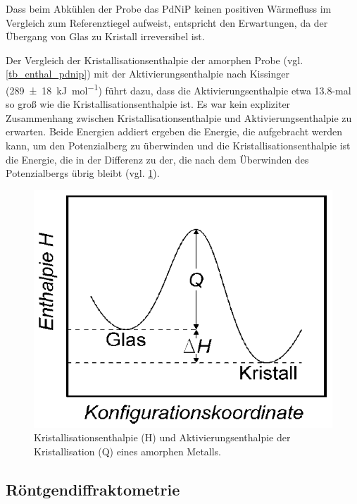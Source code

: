 \documentclass[
	a4paper,
	12pt,
	pagesize,
	ngerman
]{scrartcl}
\begin{document}
	Dass beim Abkühlen der Probe das PdNiP keinen positiven Wärmefluss im Vergleich zum Referenztiegel aufweist, entspricht den Erwartungen, da der Übergang von Glas zu Kristall irreversibel ist.

	Der Vergleich der Kristallisationsenthalpie der amorphen Probe (vgl. \cref{tb_enthal_pdnip}) mit der Aktivierungsenthalpie nach Kissinger (\SI{289 \pm 18}{\kilo \joule \per \mol}) führt dazu, dass die Aktivierungsenthalpie etwa \SI{13,8}{}-mal so groß wie die Kristallisationsenthalpie ist.
	Es war kein expliziter Zusammenhang zwischen Kristallisationsenthalpie und Aktivierungsenthalpie zu erwarten.
	Beide Energien addiert ergeben die Energie, die aufgebracht werden kann, um den Potenzialberg zu überwinden und die Kristallisationsenthalpie ist die Energie, die in der Differenz zu der, die nach dem Überwinden des Potenzialbergs übrig bleibt (vgl. \cref{fig_kissinger}).

	\begin{figure}[H]
		\includegraphics[width=0.7\linewidth]{img/kissinger}
		\caption{
			Kristallisationsenthalpie (H) und Aktivierungsenthalpie der Kristallisation (Q) eines amorphen Metalls. \cite{anleitung}
		}
		\label{fig_kissinger}
	\end{figure}

	\subsection{Röntgendiffraktometrie}
\end{document}
